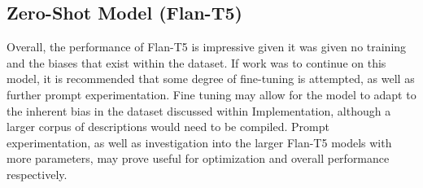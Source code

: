 \subsection{Zero-Shot Model (Flan-T5)}
Overall, the performance of Flan-T5 is impressive given it was given no training and the biases that exist within the dataset.
If work was to continue on this model, it is recommended that some degree of fine-tuning is attempted, as well as further prompt experimentation. 
Fine tuning may allow for the model to adapt to the inherent bias in the dataset discussed within Implementation, although a larger corpus of descriptions would need to be compiled. 
Prompt experimentation, as well as investigation into the larger Flan-T5 models with more parameters, may prove useful for optimization and overall performance respectively.

